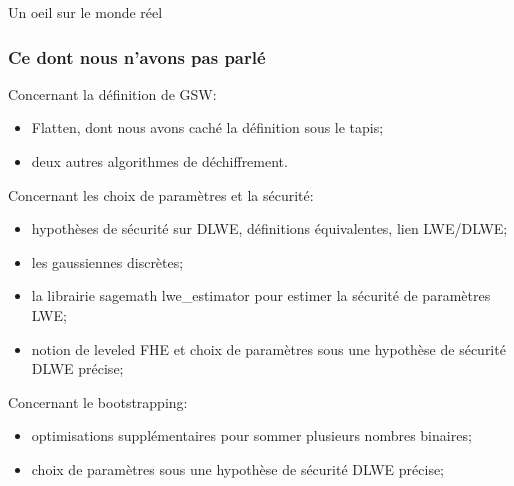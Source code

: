 \documentclass[10pt,xcolor={usenames,dvipsnames}]{beamer}
\begin{document}
\begin{section}{Un oeil sur le monde réel}
\begin{frame}
\end{frame} 


\begin{frame}
\frametitle{Ce dont nous n'avons pas parlé}
Concernant la définition de GSW:
\begin{itemize}
\item Flatten, dont nous avons caché la définition sous le tapis;
\item deux autres algorithmes de déchiffrement.
\end{itemize}
Concernant les choix de paramètres et la sécurité:
\vspace{-0.2cm}

\begin{itemize}
\item hypothèses de sécurité sur DLWE, définitions équivalentes, lien LWE/DLWE;
\item les gaussiennes discrètes;
\item la librairie sagemath lwe\_estimator pour estimer la sécurité de paramètres LWE;
\item notion de leveled FHE et choix de paramètres sous une hypothèse de sécurité DLWE précise;
\end{itemize}

Concernant le bootstrapping:
\begin{itemize}
\item optimisations supplémentaires pour sommer plusieurs nombres binaires;
\item choix de paramètres sous une hypothèse de sécurité DLWE précise;
\end{itemize}
\end{frame}

\end{section}


\end{document}
